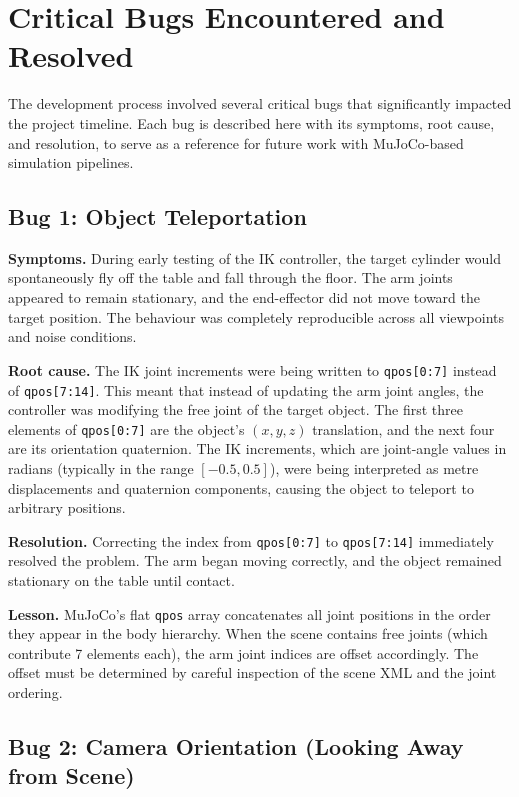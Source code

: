 \documentclass[11pt,a4paper]{report}
\begin{document}
\section{Critical Bugs Encountered and Resolved}
\label{sec:bugs}

The development process involved several critical bugs that significantly impacted the project timeline. Each bug is described here with its symptoms, root cause, and resolution, to serve as a reference for future work with MuJoCo-based simulation pipelines.

\subsection{Bug 1: Object Teleportation}
\label{sec:bug_teleportation}

\textbf{Symptoms.} During early testing of the IK controller, the target cylinder would spontaneously fly off the table and fall through the floor. The arm joints appeared to remain stationary, and the end-effector did not move toward the target position. The behaviour was completely reproducible across all viewpoints and noise conditions.

\textbf{Root cause.} The IK joint increments were being written to \texttt{qpos[0:7]} instead of \texttt{qpos[7:14]}. This meant that instead of updating the arm joint angles, the controller was modifying the free joint of the target object. The first three elements of \texttt{qpos[0:7]} are the object's $(x, y, z)$ translation, and the next four are its orientation quaternion. The IK increments, which are joint-angle values in radians (typically in the range $[-0.5, 0.5]$), were being interpreted as metre displacements and quaternion components, causing the object to teleport to arbitrary positions.

\textbf{Resolution.} Correcting the index from \texttt{qpos[0:7]} to \texttt{qpos[7:14]} immediately resolved the problem. The arm began moving correctly, and the object remained stationary on the table until contact.

\textbf{Lesson.} MuJoCo's flat \texttt{qpos} array concatenates all joint positions in the order they appear in the body hierarchy. When the scene contains free joints (which contribute 7 elements each), the arm joint indices are offset accordingly. The offset must be determined by careful inspection of the scene XML and the joint ordering.

\subsection{Bug 2: Camera Orientation (Looking Away from Scene)}
\label{sec:bug_camera}
\end{document}
